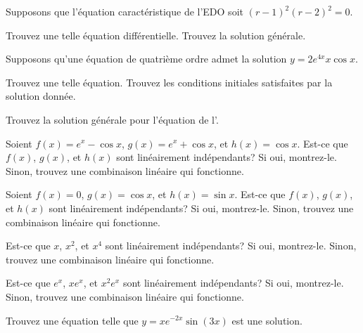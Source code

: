 \begin{exercise}
Supposons que l'équation caractéristique de l'EDO soit  
${(r-1)}^2{(r-2)}^2 = 0$.
\begin{tasks}
\task
Trouvez une telle équation différentielle. 
\task
Trouvez la solution générale.
\end{tasks}
\end{exercise}

\begin{exercise} \label{hol:eqfromsolex}
Supposons qu'une équation de quatrième ordre admet la solution 
$y = 2 e^{4x} x \cos x$.  
\begin{tasks}
\task
Trouvez une telle équation.
\task
Trouvez les conditions initiales satisfaites par la solution donnée. 
\end{tasks}
\end{exercise}

\begin{exercise}
Trouvez la solution générale pour l'équation de l'.
\end{exercise}

\begin{exercise}
Soient
$f(x) = e^x - \cos x$, $g(x) = e^x + \cos x$, et $h(x) = \cos x$.
Est-ce que $f(x)$, $g(x)$, et $h(x)$
sont linéairement indépendants?  Si oui, montrez-le. Sinon, trouvez une combinaison linéaire qui fonctionne. 
\end{exercise}

\begin{exercise}
Soient
$f(x) = 0$, $g(x) = \cos x$, et $h(x) = \sin x$.
Est-ce que  $f(x)$, $g(x)$, et $h(x)$
sont linéairement indépendants?  Si oui, montrez-le. Sinon, trouvez une combinaison linéaire qui fonctionne. 
\end{exercise}

\begin{exercise}
Est-ce que   $x$, $x^2$, et $x^4$
sont linéairement indépendants?  Si oui, montrez-le. Sinon, trouvez une combinaison linéaire qui fonctionne. 
\end{exercise}

\begin{exercise}
Est-ce que $e^x$, $xe^x$, et $x^2e^x$
sont linéairement indépendants?  Si oui, montrez-le. Sinon, trouvez une combinaison linéaire qui fonctionne. 
\end{exercise}

\begin{exercise}
Trouvez une équation telle que  $y=xe^{-2x}\sin(3x)$ est une solution.
\end{exercise}

